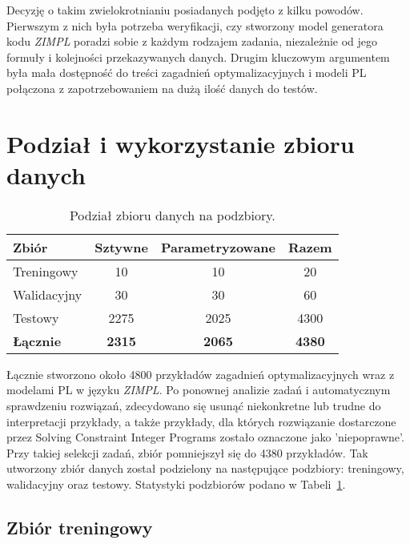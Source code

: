 Decyzję o takim zwielokrotnianiu posiadanych podjęto z kilku powodów. Pierwszym z nich była potrzeba weryfikacji, czy stworzony model generatora kodu  \textit{ZIMPL} poradzi sobie z każdym rodzajem zadania, niezależnie od jego formuły i kolejności przekazywanych danych. Drugim kluczowym argumentem była mała dostępność do treści zagadnień optymalizacyjnych i modeli PL połączona z zapotrzebowaniem na dużą ilość danych do testów.

\section{Podział i wykorzystanie zbioru danych}

\begin{table}
\caption{Podział zbioru danych na podzbiory.}\label{tab:dataset:stats}
\centering%
\begin{tabular}{|l|c|c|c|}
\hline
\textbf{Zbiór} & \textbf{Sztywne} & \textbf{Parametryzowane} & \textbf{Razem} \\
\hline
Treningowy & 10 & 10 & 20\\
\hline
Walidacyjny & 30 & 30 & 60\\
\hline
Testowy & 2275 & 2025 & 4300\\
\hline
\textbf{Łącznie} & \textbf{2315} & \textbf{2065} & \textbf{4380}\\
\hline
\end{tabular}
\end{table}

Łącznie stworzono około 4800 przykładów zagadnień optymalizacyjnych wraz z modelami PL w języku  \textit{ZIMPL}. Po ponownej analizie zadań i automatycznym sprawdzeniu rozwiązań, zdecydowano się usunąć niekonkretne lub trudne do interpretacji przykłady, a także przykłady, dla których rozwiązanie dostarczone przez Solving Constraint Integer Programs zostało oznaczone jako 'niepoprawne'. Przy takiej selekcji zadań, zbiór pomniejszył się do 4380 przykładów. Tak utworzony zbiór danych został podzielony na następujące podzbiory: treningowy, walidacyjny oraz testowy. Statystyki podzbiorów podano w Tabeli~\ref{tab:dataset:stats}. 

\subsection{Zbiór treningowy}

